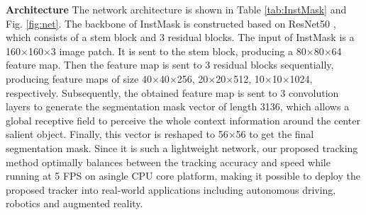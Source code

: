 \documentclass[review]{elsarticle}
\begin{document}
\begin{CJK*}{UTF8}{gbsn}
\textbf{Architecture} The network architecture is shown in Table \ref{tab:InstMask} and Fig. \ref{fig:net}. The backbone of InstMask is constructed based on ResNet50 \cite{He2016DeepRL}, which consists of a stem block and 3 residual blocks.
The input of InstMask is a 160$\times$160$\times$3 image patch. It is sent to the stem block, producing a 80$\times$80$\times$64 feature map. Then the feature map is sent to 3 residual blocks sequentially, producing feature maps of size 40$\times$40$\times$256, 20$\times$20$\times$512, 10$\times$10$\times$1024, respectively. Subsequently, the obtained feature map is sent to 3 convolution layers to generate the segmentation mask vector of length 3136, which allows a global receptive field to perceive the whole context information around the center salient object. Finally, this vector is reshaped to 56$\times$56 to get the final segmentation mask. Since it is such a lightweight network, our proposed tracking method optimally balances between the tracking accuracy and speed while running at 5 FPS on asingle CPU core platform, making it possible to deploy the proposed tracker into real-world applications including autonomous driving, robotics and augmented reality.


\end{CJK*}
\end{document}
